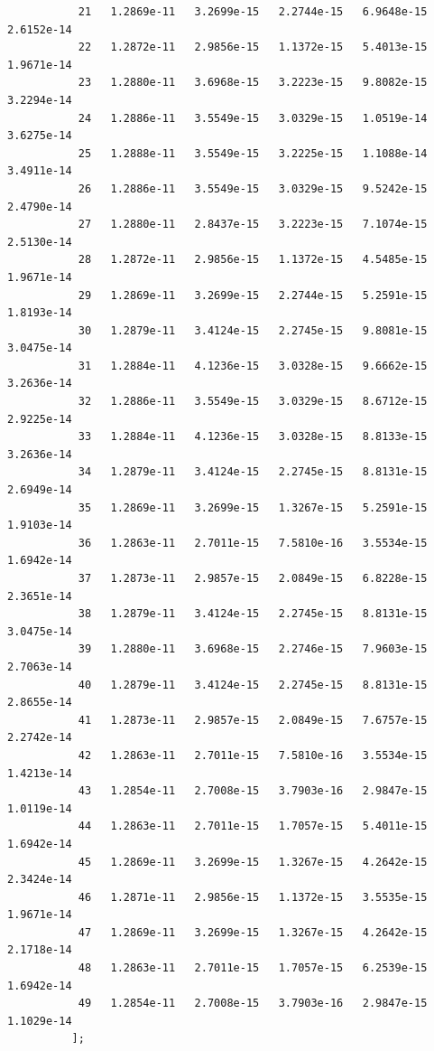 \documentclass[a4paper,10pt]{report}%
\begin{document}
\begin{lstlisting}
           21   1.2869e-11   3.2699e-15   2.2744e-15   6.9648e-15   2.6152e-14
           22   1.2872e-11   2.9856e-15   1.1372e-15   5.4013e-15   1.9671e-14
           23   1.2880e-11   3.6968e-15   3.2223e-15   9.8082e-15   3.2294e-14
           24   1.2886e-11   3.5549e-15   3.0329e-15   1.0519e-14   3.6275e-14
           25   1.2888e-11   3.5549e-15   3.2225e-15   1.1088e-14   3.4911e-14
           26   1.2886e-11   3.5549e-15   3.0329e-15   9.5242e-15   2.4790e-14
           27   1.2880e-11   2.8437e-15   3.2223e-15   7.1074e-15   2.5130e-14
           28   1.2872e-11   2.9856e-15   1.1372e-15   4.5485e-15   1.9671e-14
           29   1.2869e-11   3.2699e-15   2.2744e-15   5.2591e-15   1.8193e-14
           30   1.2879e-11   3.4124e-15   2.2745e-15   9.8081e-15   3.0475e-14
           31   1.2884e-11   4.1236e-15   3.0328e-15   9.6662e-15   3.2636e-14
           32   1.2886e-11   3.5549e-15   3.0329e-15   8.6712e-15   2.9225e-14
           33   1.2884e-11   4.1236e-15   3.0328e-15   8.8133e-15   3.2636e-14
           34   1.2879e-11   3.4124e-15   2.2745e-15   8.8131e-15   2.6949e-14
           35   1.2869e-11   3.2699e-15   1.3267e-15   5.2591e-15   1.9103e-14
           36   1.2863e-11   2.7011e-15   7.5810e-16   3.5534e-15   1.6942e-14
           37   1.2873e-11   2.9857e-15   2.0849e-15   6.8228e-15   2.3651e-14
           38   1.2879e-11   3.4124e-15   2.2745e-15   8.8131e-15   3.0475e-14
           39   1.2880e-11   3.6968e-15   2.2746e-15   7.9603e-15   2.7063e-14
           40   1.2879e-11   3.4124e-15   2.2745e-15   8.8131e-15   2.8655e-14
           41   1.2873e-11   2.9857e-15   2.0849e-15   7.6757e-15   2.2742e-14
           42   1.2863e-11   2.7011e-15   7.5810e-16   3.5534e-15   1.4213e-14
           43   1.2854e-11   2.7008e-15   3.7903e-16   2.9847e-15   1.0119e-14
           44   1.2863e-11   2.7011e-15   1.7057e-15   5.4011e-15   1.6942e-14
           45   1.2869e-11   3.2699e-15   1.3267e-15   4.2642e-15   2.3424e-14
           46   1.2871e-11   2.9856e-15   1.1372e-15   3.5535e-15   1.9671e-14
           47   1.2869e-11   3.2699e-15   1.3267e-15   4.2642e-15   2.1718e-14
           48   1.2863e-11   2.7011e-15   1.7057e-15   6.2539e-15   1.6942e-14
           49   1.2854e-11   2.7008e-15   3.7903e-16   2.9847e-15   1.1029e-14
          ];
\end{lstlisting}
\end{document}
